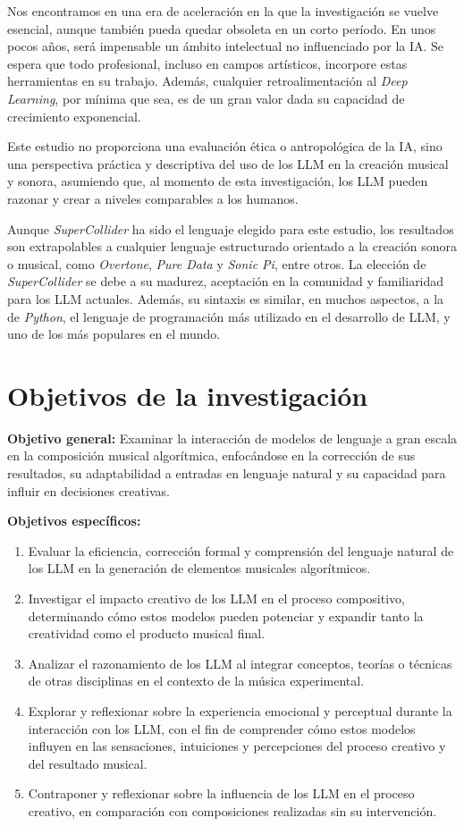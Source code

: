 Nos encontramos en una era de aceleración en la que la investigación se vuelve esencial, aunque también pueda quedar obsoleta en un corto período. En unos pocos años, será impensable un ámbito intelectual no influenciado por la IA. Se espera que todo profesional, incluso en campos artísticos, incorpore estas herramientas en su trabajo. Además, cualquier retroalimentación al \textit{Deep Learning}, por mínima que sea, es de un gran valor dada su capacidad de crecimiento exponencial.

Este estudio no proporciona una evaluación ética o antropológica de la IA, sino una perspectiva práctica y descriptiva del uso de los LLM en la creación musical y sonora, asumiendo que, al momento de esta investigación, los LLM pueden razonar y crear a niveles comparables a los humanos.

Aunque \textit{SuperCollider} ha sido el lenguaje elegido para este estudio, los resultados son extrapolables a cualquier lenguaje estructurado orientado a la creación sonora o musical, como \textit{Overtone}, \textit{Pure Data} y \textit{Sonic Pi}, entre otros. La elección de \textit{SuperCollider} se debe a su madurez, aceptación en la comunidad y familiaridad para los LLM actuales. Además, su sintaxis es similar, en muchos aspectos, a la de \textit{Python}, el lenguaje de programación más utilizado en el desarrollo de LLM, y uno de los más populares en el mundo.


\section{Objetivos de la investigación}

\textbf{Objetivo general:} Examinar la interacción de modelos de lenguaje a gran escala en la composición musical algorítmica, enfocándose en la corrección de sus resultados, su adaptabilidad a entradas en lenguaje natural y su capacidad para influir en decisiones creativas.

\textbf{Objetivos específicos:}
\begin{enumerate}[label=\alph*)]
\item Evaluar la eficiencia, corrección formal y comprensión del lenguaje natural de los LLM en la generación de elementos musicales algorítmicos.
\item Investigar el impacto creativo de los LLM en el proceso compositivo, determinando cómo estos modelos pueden potenciar y expandir tanto la creatividad como el producto musical final.
\item Analizar el razonamiento de los LLM al integrar conceptos, teorías o técnicas de otras disciplinas en el contexto de la música experimental.
\item Explorar y reflexionar sobre la experiencia emocional y perceptual durante la interacción con los LLM, con el fin de comprender cómo estos modelos influyen en las sensaciones, intuiciones y percepciones del proceso creativo y del resultado musical.
\item Contraponer y reflexionar sobre la influencia de los LLM en el proceso creativo, en comparación con composiciones realizadas sin su intervención.
\end{enumerate}

